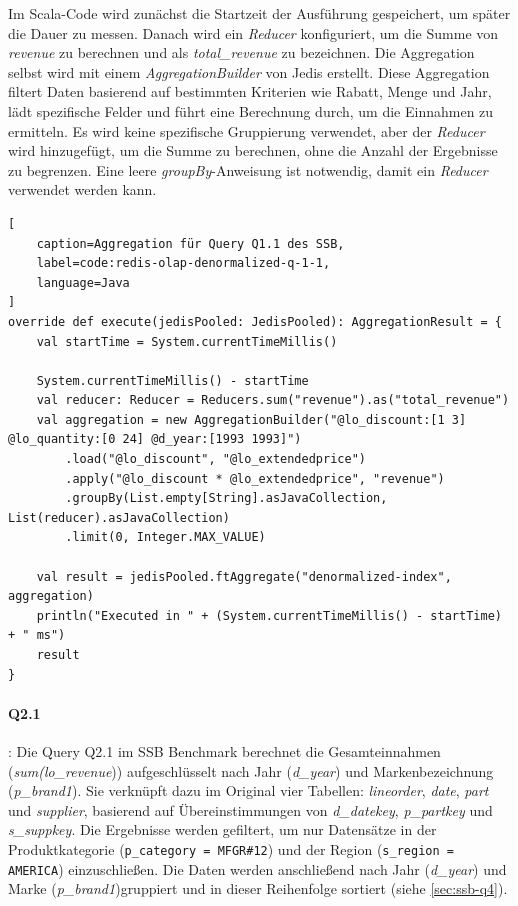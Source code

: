 Im Scala-Code wird zunächst die Startzeit der Ausführung gespeichert, um später die Dauer zu messen. Danach wird ein \emph{Reducer} konfiguriert, um die Summe von \emph{revenue} zu berechnen und als \emph{total\_revenue} zu bezeichnen. Die Aggregation selbst wird mit einem \emph{AggregationBuilder} von Jedis erstellt. Diese Aggregation filtert Daten basierend auf bestimmten Kriterien wie Rabatt, Menge und Jahr, lädt spezifische Felder und führt eine Berechnung durch, um die Einnahmen zu ermitteln. Es wird keine spezifische Gruppierung verwendet, aber der \emph{Reducer} wird hinzugefügt, um die Summe zu berechnen, ohne die Anzahl der Ergebnisse zu begrenzen. Eine leere \emph{groupBy}-Anweisung ist notwendig, damit ein \emph{Reducer} verwendet werden kann.

\begin{lstlisting}[
    caption=Aggregation für Query Q1.1 des SSB,
    label=code:redis-olap-denormalized-q-1-1,
    language=Java
]
override def execute(jedisPooled: JedisPooled): AggregationResult = {
	val startTime = System.currentTimeMillis()

	System.currentTimeMillis() - startTime
	val reducer: Reducer = Reducers.sum("revenue").as("total_revenue")
	val aggregation = new AggregationBuilder("@lo_discount:[1 3] @lo_quantity:[0 24] @d_year:[1993 1993]")
		.load("@lo_discount", "@lo_extendedprice")
		.apply("@lo_discount * @lo_extendedprice", "revenue")
		.groupBy(List.empty[String].asJavaCollection, List(reducer).asJavaCollection)
		.limit(0, Integer.MAX_VALUE)

	val result = jedisPooled.ftAggregate("denormalized-index", aggregation)
	println("Executed in " + (System.currentTimeMillis() - startTime) + " ms")
	result
}
\end{lstlisting}


\paragraph{Q2.1}: Die Query Q2.1 im SSB Benchmark berechnet die Gesamteinnahmen\\
(\emph{sum(lo\_revenue})) aufgeschlüsselt nach Jahr (\emph{d\_year}) und Markenbezeichnung\\
(\emph{p\_brand1}).
Sie verknüpft dazu im Original vier Tabellen: \emph{lineorder}, \emph{date}, \emph{part} und \emph{supplier}, basierend auf Übereinstimmungen von \emph{d\_datekey}, \emph{p\_partkey} und\\ \emph{s\_suppkey}. Die Ergebnisse werden gefiltert, um nur Datensätze in der Produktkategorie (\lstinline|p_category = MFGR#12|) und der Region (\lstinline|s_region = AMERICA|) einzuschließen. Die Daten werden anschließend nach Jahr (\emph{d\_year}) und Marke (\emph{p\_brand1})gruppiert und in dieser Reihenfolge sortiert (siehe \cref{sec:ssb-q4}).

